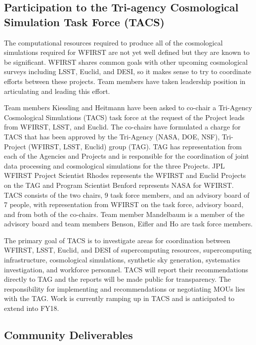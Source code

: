 \subsection{Participation to the Tri-agency  Cosmological Simulation Task Force (TACS)}

The computational resources required to produce all of the cosmological simulations required for WFIRST are not yet well defined but they are known to be significant. WFIRST shares common goals with other upcoming cosmological surveys including LSST, Euclid, and DESI, so it makes sense to try to coordinate efforts between these projects. Team members have taken leadership position in articulating and leading this effort.

Team members Kiessling and Heitmann have been asked to co-chair a Tri-Agency Cosmological Simulations (TACS) task force at the request of the Project leads from WFIRST, LSST, and Euclid. The co-chairs have formulated a charge for TACS that has been approved by the Tri-Agency (NASA, DOE, NSF), Tri-Project (WFIRST, LSST, Euclid) group (TAG). TAG has representation from each of the Agencies and Projects and is responsible for the coordination of joint data processing and cosmological simulations for the three Projects. JPL WFIRST Project Scientist Rhodes represents the WFIRST and Euclid Projects on the TAG and Program Scientist Benford represents NASA for WFIRST. TACS consists of the two chairs, 9 task force members, and an advisory board of 7 people, with representation from WFIRST on the task force, advisory board, and from both of the co-chairs. Team member Mandelbaum is a member of the advisory board and team members Benson, Eifler and Ho are task force members.

The primary goal of TACS is to investigate areas for coordination between WFIRST, LSST, Euclid, and DESI of supercomputing resources, supercomputing infrastructure, cosmological simulations, synthetic sky generation, systematics investigation, and workforce personnel. TACS will report their recommendations directly to TAG and the reports will be made public for transparency. The responsibility for implementing and recommendations or negotiating MOUs lies with the TAG. Work is currently ramping up in TACS and is anticipated to extend into FY18.

\subsection{Community Deliverables}

